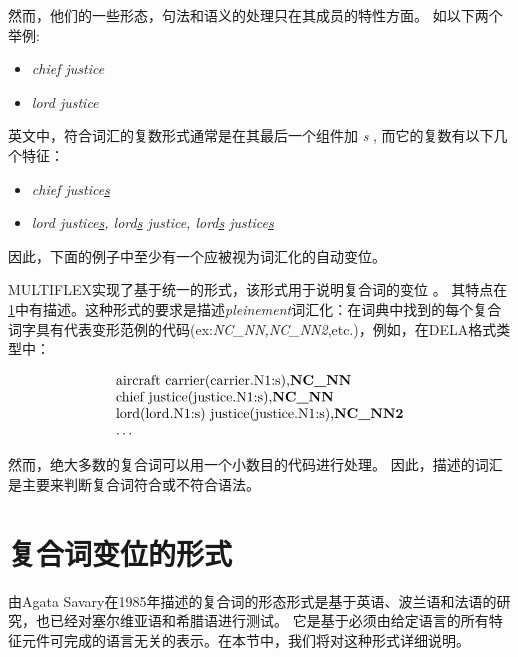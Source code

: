 然而，他们的一些形态，句法和语义的处理只在其成员的特性方面。 
如以下两个举例:

\begin{itemize}
\item \emph{chief justice}
\item \emph{lord justice}
\end{itemize} 

\noindent 英文中，符合词汇的复数形式通常是在其最后一个组件加 \emph{s} , 而它的复数有以下几个特征：

\begin{itemize}
\item \emph{chief justice\underline{s}}
\item \emph{lord justice\underline{s}, lord\underline{s} justice,
lord\underline{s} justice\underline{s}}
\end{itemize}
 
\bigskip
\noindent 因此，下面的例子中至少有一个应被视为词汇化的自动变位。

\bigskip
\noindent MULTIFLEX实现了基于统一的形式，该形式用于说明复合词的变位 \cite{Savary05}。
其特点在\ref{section:formalism}中有描述。这种形式的要求是描述\emph{pleinement}词汇化：在词典中找到的每个复合词字具有代表变形范例的代码(ex:\emph{NC\_NN,NC\_NN2},etc.)，例如，在DELA格式类型中：

\[
\begin{array}[c]{l}
  $aircraft carrier(carrier.N1:s),\textbf{NC\_NN}$ \\
  $chief justice(justice.N1:s),\textbf{NC\_NN}$ \\
  $lord(lord.N1:s) justice(justice.N1:s),\textbf{NC\_NN2}$ \\
  \dots
\end{array}
\]

\bigskip
\noindent 然而，绝大多数的复合词可以用一个小数目的代码进行处理。
因此，描述的词汇是主要来判断复合词符合或不符合语法。

\section{复合词变位的形式}
\label{section:formalism}
由Agata Savary在1985年\cite{Savary05}描述的复合词的形态形式是基于英语、波兰语和法语的研究，也已经对塞尔维亚语\cite{Krstevetal06}和希腊语\cite{Foufi13}进行测试。
它是基于必须由给定语言的所有特征元件可完成的语言无关的表示。在本节中，我们将对这种形式详细说明。

